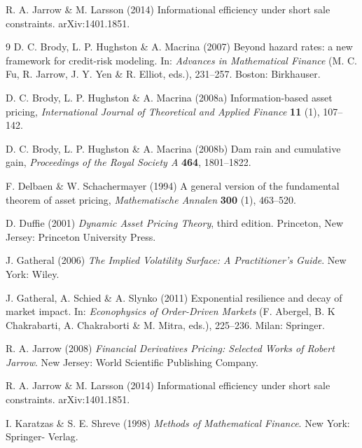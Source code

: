 \documentclass{ws-ijtaf}
\begin{document}
R. A. Jarrow \& M. Larsson (2014) Informational efficiency under short sale constraints. arXiv:1401.1851.


\begin{thebibliography}{9}
 D. C. Brody, L. P. Hughston \& A. Macrina (2007) Beyond hazard rates: a new framework for credit-risk modeling. In: {\it Advances in Mathematical Finance} (M. C. Fu, R. Jarrow, J. Y. Yen
\& R. Elliot, eds.), 231--257. Boston: Birkhauser.

D. C. Brody, L. P. Hughston \& A. Macrina (2008a) Information-based asset pricing,
{\it International Journal of Theoretical and Applied Finance} {\bf 11} (1), 107--142.

D. C. Brody, L. P. Hughston \& A. Macrina (2008b) Dam rain and cumulative gain,
{\it Proceedings of the Royal Society A} {\bf 464}, 1801--1822.

 F. Delbaen \& W. Schachermayer (1994) A general version of the fundamental theorem of asset pricing, {\it Mathematische Annalen} {\bf 300} (1), 463--520.

 D. Duffie (2001) {\it Dynamic Asset Pricing Theory}, third edition. Princeton, New Jersey: Princeton University Press.

 J. Gatheral (2006) {\it The Implied Volatility Surface: A Practitioner's Guide}. New York: Wiley.

 J. Gatheral, A. Schied \& A. Slynko (2011) Exponential resilience and decay of market impact. In: {\it Econophysics of Order-Driven Markets} (F. Abergel, B. K Chakrabarti, A. Chakraborti \& M. Mitra, eds.), 225--236. Milan: Springer.

 R. A. Jarrow (2008) {\it Financial Derivatives Pricing: Selected Works of Robert Jarrow}. New
Jersey: World Scientific Publishing Company.

 R. A. Jarrow \& M. Larsson (2014) Informational efficiency under short sale constraints. arXiv:1401.1851.

 I. Karatzas \& S. E. Shreve (1998) {\it Methods of Mathematical Finance}. New York: Springer- Verlag.


\end{thebibliography}
\end{document}
